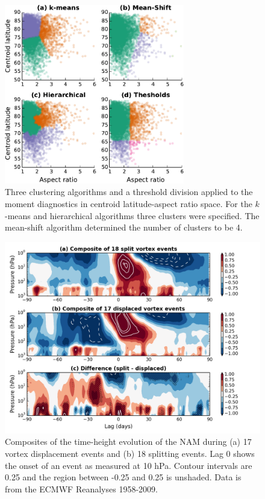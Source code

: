 \begin{figure}
 \centering
 \noindent\includegraphics[width=0.7\textwidth]{figures/chapter-moments/clustering.pdf}
 \caption[Clustering algorithms applied to the moment diagnostics.]{Three
   clustering algorithms and a threshold division applied to the moment
   diagnostics in centroid latitude-aspect ratio space. For the $k$-means and
   hierarchical algorithms three clusters were specified. The mean-shift
   algorithm determined the number of clusters to be 4.}
 \label{fig:clusters}
\end{figure}


\begin{figure}
 \centering
 \noindent\includegraphics[width=\textwidth]{figures/chapter-moments/dripping_paint.png}
 \caption[NAM composites for split and displaced vortex events.]{Composites of
   the time-height evolution of the NAM during (a) 17 vortex displacement events
   and (b) 18 splitting events. Lag 0 shows the onset of an event as measured at
   10 hPa. Contour intervals are 0.25 and the region between -0.25 and 0.25 is
   unshaded. Data is from the ECMWF Reanalyses 1958-2009.}
 \label{fig:dripping_paint}
\end{figure}

